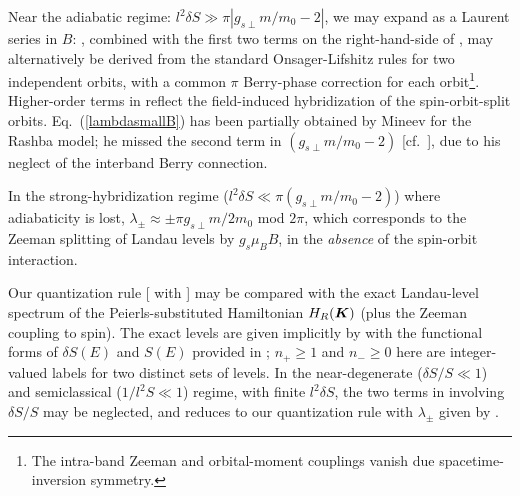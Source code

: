 \documentclass[aps, showpacs, twocolumn, notitlepage, superscriptaddress]{revtex4-1}
\begin{document}
Near the adiabatic regime: $l^2\delta S \gg \pi|g_{s\perp} m/m_0{-}2|$, we may expand  as a Laurent series in $B$:
, combined with the first two terms on the right-hand-side of , may alternatively be derived from the standard Onsager-Lifshitz rules for two independent orbits, with a common $\pi$ Berry-phase correction for each orbit\footnote{The intra-band Zeeman and orbital-moment couplings vanish due spacetime-inversion symmetry\cite{topoferm}.}. Higher-order terms in  reflect the field-induced hybridization of the spin-orbit-split orbits. 
Eq.\ (\ref{lambdasmallB}) has been partially obtained by Mineev for the Rashba model\cite{mineev_haas--van_2005}; he missed the second term in $(g_{s\perp}m/m_0-2)$ [cf.\ ], due to his neglect of the interband Berry connection. 



In the strong-hybridization regime ($l^2\delta S {\ll}\pi(g_{s\perp}m/m_0{-}2)$) where adiabaticity is lost, $\lambda_{\pm}{\approx}{\pm}\pi g_{s\perp}m/2m_0$ mod $2\pi$, which corresponds to the Zeeman splitting of Landau levels by $g_{s}\mu_BB$, in the \textit{absence} of the spin-orbit interaction. 

Our quantization rule [ with ] may be compared with the  exact Landau-level spectrum of the Peierls-substituted Hamiltonian $H_R(\boldsymbol{K})$ (plus the Zeeman coupling to spin).  The exact levels\cite{bychkov_oscillatory_1984} are given implicitly by
with the functional forms of $\delta S(E)$ and $S(E)$ provided in ;  $n_{+}{\ge} 1$ and $n_-{\ge} 0$ here are integer-valued labels for two distinct sets of levels. In the near-degenerate ($\delta S/S\ll 1$) and semiclassical ($1/l^2S \ll 1$) regime, with finite $l^2\delta S$, the two terms in  involving $\delta S/S$  may be neglected, and  reduces to our quantization rule with $\lambda_{\pm}$ given by . 
\end{document}
